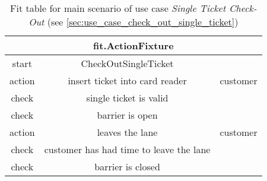 
\begin{table}
\begin{centering}
\begin{tabular}{|c|c|c||c||c||c|}
\hline 
\multicolumn{6}{|c|}{fit.ActionFixture}\tabularnewline
\hline 
start & CheckOutSingleTicket & \multicolumn{4}{c|}{}\tabularnewline
\hline 
action & insert ticket into card reader & \multicolumn{4}{c|}{customer}\tabularnewline
\hline 
check & single ticket is valid & \multicolumn{4}{c|}{}\tabularnewline
\hline 
check & barrier is open & \multicolumn{4}{c|}{}\tabularnewline
\hline 
action & leaves the lane & \multicolumn{4}{c|}{customer}\tabularnewline
\hline 
check & customer has had time to leave the lane & \multicolumn{4}{c|}{}\tabularnewline
\hline 
check & barrier is closed & \multicolumn{4}{c|}{}\tabularnewline
\hline 
\end{tabular}
\par\end{centering}

\caption{Fit table for main scenario of use case \emph{Single Ticket Check-Out} (see \autoref{sec:use_case_check_out_single_ticket})}
\end{table}
